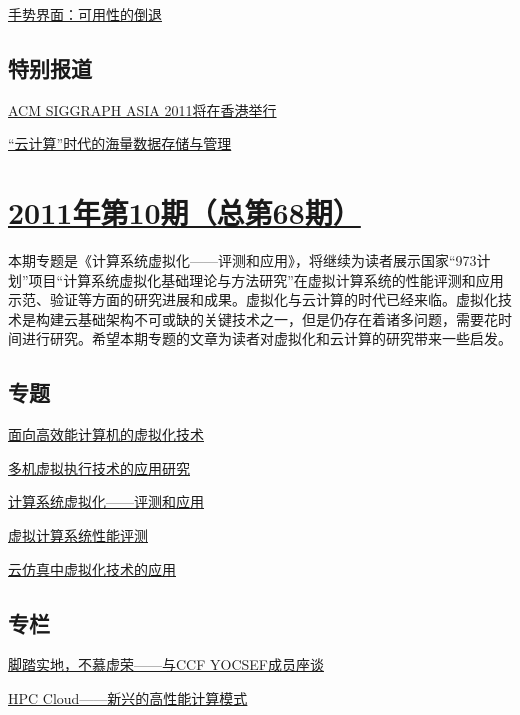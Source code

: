 \documentclass[a4paper]{article}
\begin{document}
\href{http://history.ccf.org.cn/resources/1190201776262/2011/12/01/18.pdf}{手势界面：可用性的倒退}

\subsection{特别报道}
\href{http://history.ccf.org.cn/resources/1190201776262/2011/12/01/16.pdf}{ACM SIGGRAPH ASIA 2011将在香港举行}

\href{http://history.ccf.org.cn/resources/1190201776262/2011/12/01/15.pdf}{“云计算”时代的海量数据存储与管理}


\section{\href{http://history.ccf.org.cn/sites/ccf/jsjtbbd.jsp?contentId=2637593328494}{\textbf{2011年第10期（总第68期）}}}
本期专题是《计算系统虚拟化——评测和应用》，将继续为读者展示国家“973计划”项目“计算系统虚拟化基础理论与方法研究”在虚拟计算系统的性能评测和应用示范、验证等方面的研究进展和成果。虚拟化与云计算的时代已经来临。虚拟化技术是构建云基础架构不可或缺的关键技术之一，但是仍存在着诸多问题，需要花时间进行研究。希望本期专题的文章为读者对虚拟化和云计算的研究带来一些启发。
\subsection{专题}
\href{http://history.ccf.org.cn/resources/1190201776262/2011/10/17/3.pdf}{面向高效能计算机的虚拟化技术}

\href{http://history.ccf.org.cn/resources/1190201776262/2011/10/17/5.pdf}{多机虚拟执行技术的应用研究}

\href{http://history.ccf.org.cn/resources/1190201776262/2011/10/17/1.pdf}{计算系统虚拟化——评测和应用}

\href{http://history.ccf.org.cn/resources/1190201776262/2011/10/17/2.pdf}{虚拟计算系统性能评测}

\href{http://history.ccf.org.cn/resources/1190201776262/2011/10/17/4.pdf}{云仿真中虚拟化技术的应用}

\subsection{专栏}
\href{http://history.ccf.org.cn/resources/1190201776262/2011/10/17/6.pdf}{脚踏实地，不慕虚荣——与CCF YOCSEF成员座谈}

\href{http://history.ccf.org.cn/resources/1190201776262/2011/10/17/9.pdf}{HPC Cloud——新兴的高性能计算模式}
\end{document}

